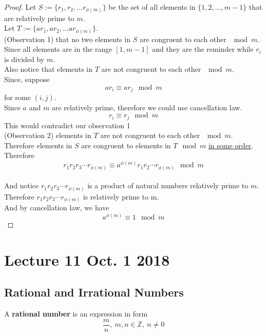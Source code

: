 \documentclass[10pt]{article}
\begin{document}
	\begin{proof}\renewcommand{\qedsymbol}{\textcolor{red}{$ \ensuremath\varheartsuit$}}
		Let $S := \{r_1, r_2, \dots r_{\phi(m)}\}$ be the set of all elements in $\{1, 2, \dots, m-1\}$ that are relatively prime to $m$. \\
		Let $T := \{a r_1, a r_2, \dots a r_{\phi(m)}\}$. \\
		(Observation 1) that no two elements in $S$ are congruent to each other $\mod m$. Since all elements are in the range $[1, m-1]$ and they are the reminder while $r_i$ is divided by $m$. \\
		Also notice that elements in $T$ are not congruent to each other $\mod m$.\\
		Since, suppose \[a r_i \equiv a r_j \mod m\] for some $(i, j)$. \\
		Since $a$ and $m$ are relatively prime, therefore we could use cancellation law.\\
		\[
			r_i \equiv r_j \mod m
		\]
		This would contradict our observation 1 \\
		(Observation 2) elements in $T$ are not congruent to each other $\mod m$. \\
		Therefore elements in $S$ are congruent to elements in $T \mod m$ \ul{in some order}. \\
		Therefore \[ r_1 r_2 r_3 \cdots r_{\phi(m)} \equiv a^{\phi(m)} r_1 r_2 \cdots r_{\phi(m)} \mod m \]\\
		 And notice $r_1 r_2 r_3 \cdots r_{\phi(m)}$ is a product of natural numbers relatively prime to $m$. \\
		 Therefore $r_1 r_2 r_3 \cdots r_{\phi(m)}$ is relatively prime to m. \\
		 And by cancellation law, we have 
		 \[
		 	a^{\phi(m)} \equiv 1 \mod m
		 \]
	\end{proof}
	
	\section{Lecture 11 Oct. 1 2018}
	\subsection{Rational and Irrational Numbers}
	\begin{definition}
		A \textbf{rational number} is an expression in form 
		\[
			\frac{m}{n},\ m,n \in \mathbb{Z},\ n \neq 0
		\]
	\end{definition}
	
\end{document}
